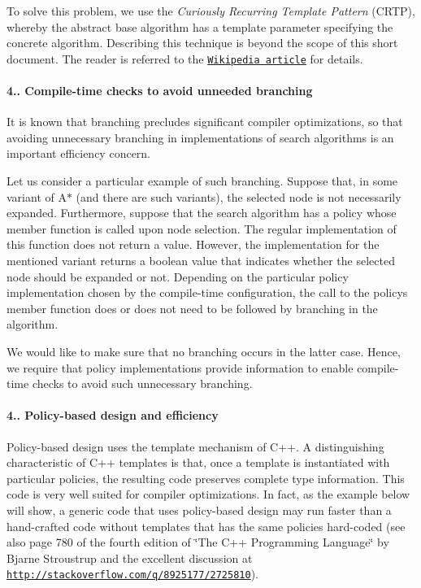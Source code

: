 To solve this problem, we use the {\itshape Curiously Recurring Template Pattern} (C\+R\+TP), whereby the abstract base algorithm has a template parameter specifying the concrete algorithm. Describing this technique is beyond the scope of this short document. The reader is referred to the \href{https://en.wikipedia.org/wiki/Curiously_recurring_template_pattern}{\tt Wikipedia article} for details.\hypertarget{index_s-branching}{}\paragraph{4.. Compile-\/time checks to avoid unneeded branching}\label{index_s-branching}
It is known that branching precludes significant compiler optimizations, so that avoiding unnecessary branching in implementations of search algorithms is an important efficiency concern.

Let us consider a particular example of such branching. Suppose that, in some variant of A$\ast$ (and there are such variants), the selected node is not necessarily expanded. Furthermore, suppose that the search algorithm has a policy whose member function is called upon node selection. The regular implementation of this function does not return a value. However, the implementation for the mentioned variant returns a boolean value that indicates whether the selected node should be expanded or not. Depending on the particular policy implementation chosen by the compile-\/time configuration, the call to the policy\textquotesingle{}s member function does or does not need to be followed by branching in the algorithm.

We would like to make sure that no branching occurs in the latter case. Hence, we require that policy implementations provide information to enable compile-\/time checks to avoid such unnecessary branching.\hypertarget{index_s-policy-efficiency}{}\paragraph{4.. Policy-\/based design and efficiency}\label{index_s-policy-efficiency}
Policy-\/based design uses the template mechanism of C++. A distinguishing characteristic of C++ templates is that, once a template is instantiated with particular policies, the resulting code preserves complete type information. This code is very well suited for compiler optimizations. In fact, as the example below will show, a generic code that uses policy-\/based design may run faster than a hand-\/crafted code without templates that has the same policies hard-\/coded (see also page 780 of the fourth edition of \char`\"{}\+The C++ Programming Language\char`\"{} by Bjarne Stroustrup and the excellent discussion at \href{http://stackoverflow.com/q/8925177/2725810}{\tt http\+://stackoverflow.\+com/q/8925177/2725810}).

